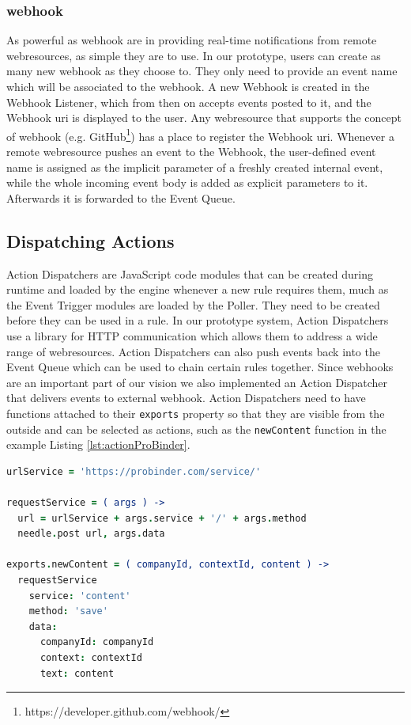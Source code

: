 \subsubsection{\gls{webhook}}
As powerful as \textrm{\gls{webhook}} are in providing real-time notifications from remote \textrm{\glspl{webresource}}, as simple they are to use.
In our prototype, users can create as many new \textrm{\gls{webhook}} as they choose to.
They only need to provide an event name which will be associated to the \textrm{\gls{webhook}}.
A new \textrm{Webhook} is created in the \textrm{Webhook Listener}, which from then on accepts events posted to it, and the \textrm{Webhook \acrshort{uri}} is displayed to the user.
Any \textrm{\gls{webresource}} that supports the concept of \textrm{\gls{webhook}} (e.g. \textrm{GitHub}\footnote{https://developer.github.com/\gls{webhook}/}) has a place to register the \textrm{Webhook} \textrm{\acrshort{uri}}.
Whenever a remote \textrm{\gls{webresource}} pushes an event to the \textrm{Webhook}, the user-defined event name is assigned as the implicit parameter of a freshly created internal event, while the whole incoming event body is added as explicit parameters to it.
Afterwards it is forwarded to the \textrm{Event Queue}.



\subsection{Dispatching Actions}
\textrm{Action Dispatchers} are \textrm{JavaScript} code modules that can be created during runtime and loaded by the engine whenever a new rule requires them, much as the \textrm{Event Trigger} modules are loaded by the \textrm{Poller}.
They need to be created before they can be used in a rule.
In our prototype system, \textrm{Action Dispatchers} use a library for \textrm{HTTP} communication which allows them to address a wide range of \textrm{\glspl{webresource}}.
\textrm{Action Dispatchers} can also push events back into the \textrm{Event Queue} which can be used to chain certain rules together.
Since \textrm{\glspl{webhook}} are an important part of our vision we also implemented an \textrm{Action Dispatcher} that delivers events to external \textrm{\gls{webhook}}.
\textrm{Action Dispatchers} need to have functions attached to their \texttt{exports} property so that they are visible from the outside and can be selected as actions, such as the \texttt{newContent} function in the example Listing \ref{lst:actionProBinder}.
\begin{lstlisting}[float=h,label=lst:actionProBinder,language=CoffeeScript,caption=Action Dispatcher code to store a new content on the ProBinder RESTful Web service; written in CoffeeScript]
urlService = 'https://probinder.com/service/'

requestService = ( args ) ->
  url = urlService + args.service + '/' + args.method
  needle.post url, args.data

exports.newContent = ( companyId, contextId, content ) ->
  requestService
    service: 'content'
    method: 'save'
    data:
      companyId: companyId
      context: contextId
      text: content
\end{lstlisting}



